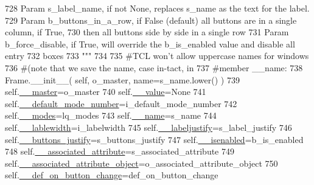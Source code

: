 \begin{DoxyCode}
728 \textcolor{stringliteral}{        Param s\_label\_name, if not None, replaces s\_name as the text for the label.}
729 \textcolor{stringliteral}{        Param b\_buttons\_in\_a\_row, if False (default) all buttons are in a single column, if True,}
730 \textcolor{stringliteral}{                then all buttons side by side in a single row}
731 \textcolor{stringliteral}{        Param b\_force\_disable, if True, will override the b\_is\_enabled value and disable all entry }
732 \textcolor{stringliteral}{              boxes}
733 \textcolor{stringliteral}{        """}
734 
735         \textcolor{comment}{#TCL won't allow uppercase names for windows}
736         \textcolor{comment}{#(note that we save the name, case in-tact, in}
737         \textcolor{comment}{#member \_\_name:}
738         Frame.\_\_init\_\_( self, o\_master, name=s\_name.lower() )
739         self.\hyperlink{classnegui_1_1pgguiutilities_1_1KeyCategoricalValueFrame_ad0cd6c8b8265cb6b27efa7bbc5e23ae0}{\_\_master}=o\_master
740         self.\hyperlink{classnegui_1_1pgguiutilities_1_1KeyCategoricalValueFrame_ac743c18f66b310548e2dd0e3076b00c7}{\_\_value}=\textcolor{keywordtype}{None}
741         self.\hyperlink{classnegui_1_1pgguiutilities_1_1KeyCategoricalValueFrame_ae5f2855d8f22b4aa8f533023ac3e7fb4}{\_\_default\_mode\_number}=i\_default\_mode\_number
742         self.\hyperlink{classnegui_1_1pgguiutilities_1_1KeyCategoricalValueFrame_aadb3b6381c9159d303cd150e5a748096}{\_\_modes}=lq\_modes
743         self.\hyperlink{classnegui_1_1pgguiutilities_1_1KeyCategoricalValueFrame_a92a1947d6110ada3bd813cc8e84d84ad}{\_\_name}=s\_name
744         self.\hyperlink{classnegui_1_1pgguiutilities_1_1KeyCategoricalValueFrame_adf2c2370358ac051464aef108d75caa3}{\_\_lablewidth}=i\_labelwidth
745         self.\hyperlink{classnegui_1_1pgguiutilities_1_1KeyCategoricalValueFrame_a96cbcef967bddfd5035b827c0ae50c05}{\_\_labeljustify}=s\_label\_justify
746         self.\hyperlink{classnegui_1_1pgguiutilities_1_1KeyCategoricalValueFrame_a1fa18274aa53997c8b5fe446779b9a9d}{\_\_buttons\_justify}=s\_buttons\_justify
747         self.\hyperlink{classnegui_1_1pgguiutilities_1_1KeyCategoricalValueFrame_afb2be50b6de2bac5c96b9d73d93da416}{\_\_isenabled}=b\_is\_enabled
748         self.\hyperlink{classnegui_1_1pgguiutilities_1_1KeyCategoricalValueFrame_aa9b8f1b85890b51192559ff142d2360f}{\_\_associated\_attribute}=s\_associated\_attribute
749         self.\hyperlink{classnegui_1_1pgguiutilities_1_1KeyCategoricalValueFrame_a14174765fdf3479d1f7f09fe1deda5cf}{\_\_associated\_attribute\_object}=o\_associated\_attribute\_object
750         self.\hyperlink{classnegui_1_1pgguiutilities_1_1KeyCategoricalValueFrame_a0e462eacf72e4afb9711c917fe1c0d6a}{\_\_def\_on\_button\_change}=def\_on\_button\_change

\end{DoxyCode}

